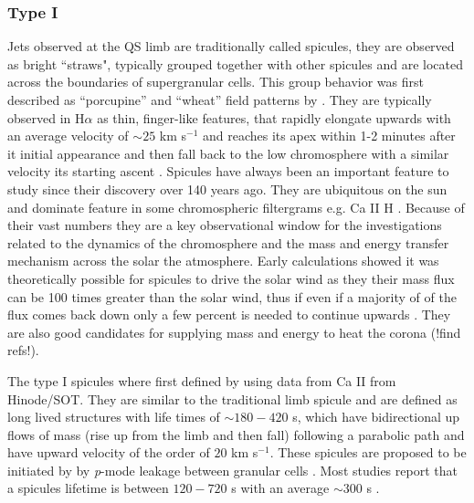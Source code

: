 \documentclass[12pt]{ociamthesis}
\begin{document}
\subsubsection{Type I}
\label{subsec:TI}
\par Jets observed at the QS limb are traditionally called spicules, they are observed as bright ``straws", typically grouped together with other spicules and are located across the boundaries of supergranular cells. This group behavior was first described as “porcupine” and “wheat” field patterns by \cite{Lippincott1957SCoA215L}. They are typically observed in H$\alpha$ as thin, finger-like features, that rapidly elongate upwards with an average velocity of $\sim 25$ km s$^{-1}$ and reaches its apex within 1-2 minutes after it initial appearance and then fall back to the low chromosphere with a similar velocity its starting ascent \citep{Tsiropoula2012}. Spicules have always been an important feature to study since their discovery over 140 years ago. They are ubiquitous on the sun and dominate feature in some chromospheric filtergrams e.g. Ca II H \cite{Pereira2016ApJ82465P}. Because of their vast numbers they are a key observational window for the investigations related to the dynamics of the chromosphere and the mass and energy transfer mechanism across the solar the atmosphere. Early calculations showed it was theoretically possible for spicules to drive the solar wind as they their mass flux can be 100 times greater than the solar wind, thus if even if a majority of of the flux comes back down only a few percent is needed to continue upwards \cite{Pneuman1978SoPh5749P,Pneuman1977AA55305P}. They are also good candidates for supplying mass and energy to heat the corona (!find refs!). \\
\par The type I spicules where first defined by \cite{Pontieu2007PASJ} using data from Ca II from Hinode/SOT. They are similar to the traditional limb spicule and are defined as long lived structures with life times of $\sim 180-420$ s, which have bidirectional up flows of mass (rise up from the limb and then fall) following a parabolic path and have upward velocity of the order of $20$ km s$^{-1}$. These spicules are proposed to be initiated by by \textit{p}-mode leakage between granular cells \citep{Pontieu2004Natur}. Most studies report that a spicules lifetime is between $120-720$ s with an average $\sim 300$ s \cite{Georgakilas1999AA341610G,Cook1984AdSpR459C,Alissandrakis1971SoPh2047A,Lippincott1957SCoA215L,Rush1954AuJPh7230R,Roberts1945ApJ}.  
\end{document}

